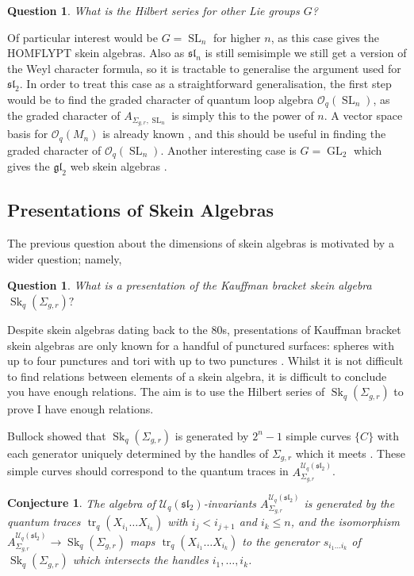 \documentclass{article}
\newcommand{\Sk}{\operatorname{Sk}}
\newcommand{\SL}{\operatorname{SL}}
\newcommand{\GL}{\operatorname{GL}}
\newcommand{\gl}{\mathfrak{gl}}
\newcommand{\slgroup}{\mathfrak{sl}}
\newcommand{\tr}{\operatorname{tr}_q}
\newtheorem{conj}[thm]{Conjecture}
\newtheorem{qs}[thm]{Question}
\begin{document}
\begin{qs}
What is the Hilbert series for other Lie groups $G$?
\end{qs}

Of particular interest would be $G = \SL_n$ for higher $n$, as this case gives the HOMFLYPT skein algebras. Also as $\slgroup_n$ is still semisimple we still get a version of the Weyl character formula, so it is tractable to generalise the argument used for $\slgroup_2$. In order to treat this case as a straightforward generalisation, the first step would be to find the graded character of quantum loop algebra $\mathscr{O}_q(\SL_n)$, as the graded character of $A_{\Sigma_{g,r}, \SL_n}$ is simply this to the power of $n$. A vector space basis for $\mathscr{O}_q(M_n)$ is already known \cite{DomokosLenagan05}, and this should be useful in finding the graded character of $\mathscr{O}_q(\SL_n)$.
Another interesting case is $G = \GL_2$ which gives the $\gl_2$ web skein algebras \cite{QueffelecWedrich18}.

\subsection{Presentations of Skein Algebras}
\label{sec:presentations}

The previous question about the dimensions of skein algebras is motivated by a wider question; namely,

\begin{qs}
What is a presentation of the Kauffman bracket skein algebra $\Sk_q(\Sigma_{g,r})?$
\end{qs} 

Despite skein algebras dating back to the 80s, presentations of Kauffman bracket skein algebras are only known for a handful of punctured surfaces: spheres with up to four punctures and tori with up to two punctures \cite{BullockPrzytycki00}. Whilst it is not difficult to find relations between elements of a skein algebra, it is difficult to conclude you have enough relations. The aim is to use the Hilbert series of $\Sk_q(\Sigma_{g,r})$ to prove I have enough relations.

Bullock showed that $\Sk_q(\Sigma_{g,r})$ is generated by $2^n-1$ simple curves $ \{C\}$ with each generator uniquely determined by the handles of $\Sigma_{g,r}$ which it meets \cite{Bullock1999}. These simple curves should correspond to the quantum traces in $A_{\Sigma_{g,r}}^{\mathcal{U}_q(\slgroup_2)}$. 

\begin{conj}
\label{conj:IsomorphismMapsTrace}
The algebra of $\mathcal{U}_q(\slgroup_2)$-invariants $A_{\Sigma_{g,r}}^{\mathcal{U}_q(\slgroup_2)}$ is generated by the quantum traces $\tr(X_{i_1} \dots X_{i_k})$ with $i_{j} < i_{j+1}$ and $i_k \leq n$, and  the isomorphism $A_{\Sigma_{g,r}}^{\mathcal{U}_q(\slgroup_2)} \to \Sk_q(\Sigma_{g,r})$ maps $\tr(X_{i_1} \dots X_{i_k})$ to the generator $s_{i_1 \dots i_k}$ of $\Sk_q(\Sigma_{g,r})$ which intersects the handles $i_1, \dots, i_k$. 
\end{conj}
\end{document}
